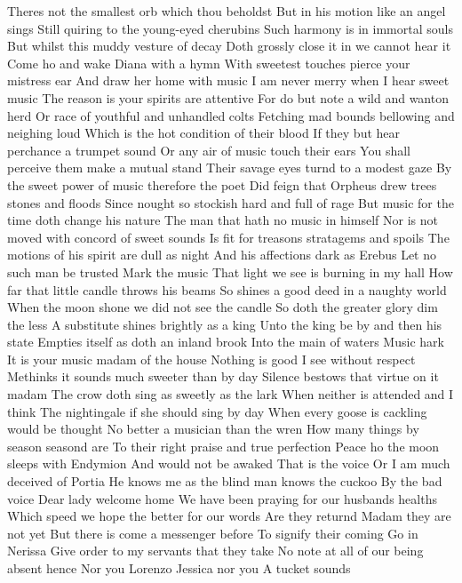 Theres not the smallest orb which thou beholdst 
But in his motion like an angel sings 
Still quiring to the young-eyed cherubins 
Such harmony is in immortal souls 
But whilst this muddy vesture of decay 
Doth grossly close it in we cannot hear it 
Come ho and wake Diana with a hymn 
With sweetest touches pierce your mistress ear 
And draw her home with music 
I am never merry when I hear sweet music 
The reason is your spirits are attentive 
For do but note a wild and wanton herd 
Or race of youthful and unhandled colts 
Fetching mad bounds bellowing and neighing loud 
Which is the hot condition of their blood 
If they but hear perchance a trumpet sound 
Or any air of music touch their ears 
You shall perceive them make a mutual stand 
Their savage eyes turnd to a modest gaze 
By the sweet power of music therefore the poet 
Did feign that Orpheus drew trees stones and floods 
Since nought so stockish hard and full of rage 
But music for the time doth change his nature 
The man that hath no music in himself 
Nor is not moved with concord of sweet sounds 
Is fit for treasons stratagems and spoils 
The motions of his spirit are dull as night 
And his affections dark as Erebus 
Let no such man be trusted Mark the music 
That light we see is burning in my hall 
How far that little candle throws his beams 
So shines a good deed in a naughty world 
When the moon shone we did not see the candle 
So doth the greater glory dim the less 
A substitute shines brightly as a king 
Unto the king be by and then his state 
Empties itself as doth an inland brook 
Into the main of waters Music hark 
It is your music madam of the house 
Nothing is good I see without respect 
Methinks it sounds much sweeter than by day 
Silence bestows that virtue on it madam 
The crow doth sing as sweetly as the lark 
When neither is attended and I think 
The nightingale if she should sing by day 
When every goose is cackling would be thought 
No better a musician than the wren 
How many things by season seasond are 
To their right praise and true perfection 
Peace ho the moon sleeps with Endymion 
And would not be awaked 
That is the voice 
Or I am much deceived of Portia 
He knows me as the blind man knows the cuckoo 
By the bad voice 
Dear lady welcome home 
We have been praying for our husbands healths 
Which speed we hope the better for our words 
Are they returnd 
Madam they are not yet 
But there is come a messenger before 
To signify their coming 
Go in Nerissa 
Give order to my servants that they take 
No note at all of our being absent hence 
Nor you Lorenzo Jessica nor you 
A tucket sounds 
